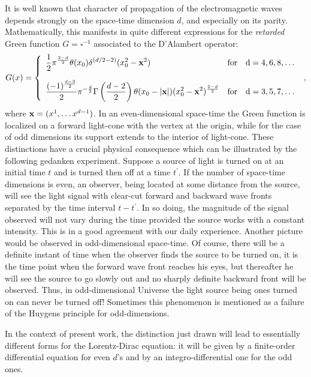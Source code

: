 \documentclass[a4paper,12pt]{article}
\begin{document}
It is well known that character of propagation of the electromagnetic waves
depends strongly on the space-time dimension $d$, and especially on its
parity. Mathematically, this manifests in quite different expressions for
the {\it retarded} Green function $G=\square ^{-1}$ associated to the
D'Alambert operator:
\begin{equation}
G(x)=\left\{
\begin{array}{ll}
\displaystyle \frac 12\pi ^{\frac{2-d}2}\theta (x_0)\delta ^{(d/2-2)}(x_0^2-%
{\bf x}^2) & {\rm for\quad d=4,6,8,\ldots } \\[5mm]
\displaystyle \frac{(-1)^{\frac{d-3}2}}2\pi ^{-\frac d2}\Gamma \left( \frac{%
d-2}2\right) \theta (x_0-|{\bf x}|)(x_0^2-{\bf x}^2)^{\frac{2-d}2} & {\rm %
for\quad d=3,5,7,\ldots }
\end{array}
\right. \,\,,  \label{gf}
\end{equation}
where ${\bf x}=(x^1,\ldots x^{d-1})$. In an even-dimensional space-time the
Green function is localized on a forward light-cone with the vertex at the
origin, while for the case of odd dimensions its support extends to the
interior of light-cone. These distinctions have a crucial physical
consequence which can be illustrated by the following gedanken experiment.
Suppose a source of light is turned on at an initial time $t$ and is turned
then off at a time $t^{\prime }$. If the number of space-time dimensions is
even, an observer, being located at some distance from the source, will see
the light signal with clear-cut forward and backward wave fronts separated
by the time interval $t-t^{\prime }$. In so doing, the magnitude of the
signal observed will not vary during the time provided the source works with
a constant intensity. This is in a good agreement with our daily experience.
Another picture would be observed in odd-dimensional space-time. Of course,
there will be a definite instant of time when the observer finds the source
to be turned on, it is the time point when the forward wave front reaches
his eyes, but thereafter he will see the source to go slowly out and no
sharply definite backward front will be observed. Thus, in odd-dimensional
Universe the light source being ones turned on can never be turned off!
Sometimes this phenomenon is mentioned as a failure of the Huygens principle
for odd-dimensions.

In the context of present work, the distinction just drawn will lead to
essentially different forms for the Lorentz-Dirac equation: it will be given
by a finite-order differential equation for even $d$'s and by an
integro-differential one for the odd ones.
\end{document}
